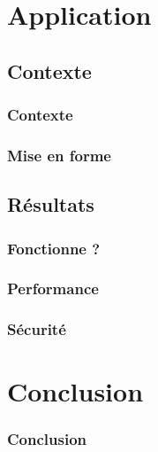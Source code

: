 \section{Application}

\subsection{Contexte}

\begin{frame}
\frametitle{Contexte}
\end{frame}

\begin{frame}
\frametitle{Mise en forme}
\end{frame}

\subsection{Résultats}

\begin{frame} %
\frametitle{Fonctionne ?}
\end{frame}

\begin{frame}
\frametitle{Performance}
\end{frame}

\begin{frame}
\frametitle{Sécurité}
\end{frame}

\section{Conclusion}

\begin{frame}
\frametitle{Conclusion}
\end{frame}